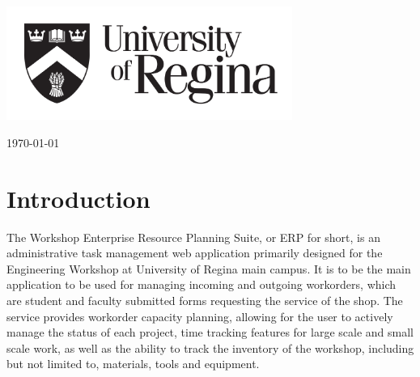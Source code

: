 \begin{titlepage}
	
	\vfill\vfill\vfill\vfill
	\includegraphics[width=0.7\textwidth]{UR.png}\\[2cm] %
	 

	
	\vfill\vfill\vfill %
	
	{\large\today} %
	
	
	\vfill %
	
\end{titlepage}



\newpage 
\tableofcontents

\newpage
\listoffigures

\newpage
\section{Introduction}
The Workshop Enterprise Resource Planning Suite, or ERP for short, is an administrative task management web application primarily designed for the Engineering Workshop at University of Regina main campus. It is to be the main application to be used for managing incoming and outgoing workorders, which are student and faculty submitted forms requesting the service of the shop. The service provides workorder capacity planning, allowing for the user to actively manage the status of each project, time tracking features for large scale and small scale work, as well as the ability to track the inventory of the workshop, including but not limited to, materials, tools and equipment. 
